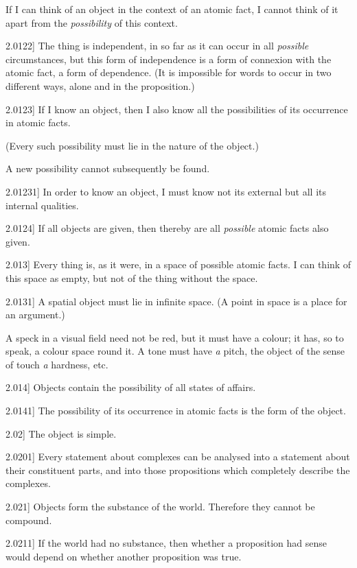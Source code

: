 \documentclass[12pt,oneside]{book}[2007/10/19]
\newcommand{\PropositionE}[2]{%
  \item[\phantomsection\label{PropE:#1}\PropGRef{#1}] #2%
}
\newcommand{\PropGRef}[1]{\hyperref[PropG:#1]{#1}}
\begin{document}
\begin{propositions}
{If I can think of an object in the context of an
atomic fact, I cannot think of it apart from the
\emph{possibility} of this context.}


\PropositionE{2.0122}
{The thing is independent, in so far as it can
occur in all \emph{possible} circumstances, but this form
of independence is a form of connexion with the
atomic fact, a form of dependence. (It is impossible
for words to occur in two different ways,
alone and in the proposition.)}


\PropositionE{2.0123}
{If I know an object, then I also know all the
possibilities of its occurrence in atomic facts.

(Every such possibility must lie in the nature
of the object.)

A new possibility cannot subsequently be
found.}


\PropositionE{2.01231}
{In order to know an object, I must know not
its external but all its internal qualities.}


\PropositionE{2.0124}
{If all objects are given, then thereby are all
\emph{possible} atomic facts also given.}


\PropositionE{2.013}
{Every thing is, as it were, in a space of possible
atomic facts. I can think of this space as empty,
but not of the thing without the space.}


\PropositionE{2.0131}
{A spatial object must lie in infinite space.
(A point in space is a place for an argument.)

A speck in a visual field need not be red,
but it must have a colour; it has, so to speak,
a colour space round it. A tone must have \emph{a}
pitch, the object of the sense of touch \emph{a} hardness,
etc.}


\PropositionE{2.014}
{Objects contain the possibility of all states of
affairs.}


\PropositionE{2.0141}
{The possibility of its occurrence in atomic facts
is the form of the object.}


\PropositionE{2.02}
{The object is simple.}


\PropositionE{2.0201}
{Every statement about complexes can be analysed
into a statement about their constituent parts, and
into those propositions which completely describe
the complexes.}


\PropositionE{2.021}
{Objects form the substance of the world.
Therefore they cannot be compound.}


\PropositionE{2.0211}
{If the world had no substance, then whether
a proposition had sense would depend on whether
another proposition was true.}



\end{propositions}
\end{document}
